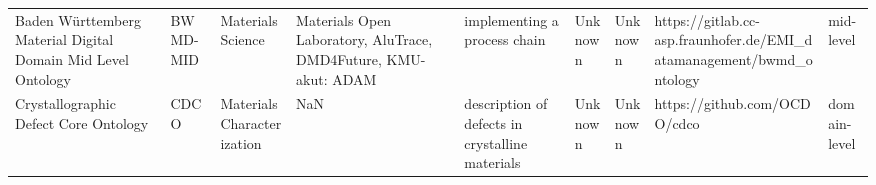 \begin{tabular}{m{5cm}m{2cm}m{5cm}m{2cm}m{2cm}m{2cm}m{2cm}m{2cm}m{2cm}}
                     Baden Württemberg Material Digital Domain Mid Level Ontology &                BWMD-MID &                           Materials Science &                                                                                                                                                                                                                                                                                                      Materials Open Laboratory, AluTrace, DMD4Future, KMU-akut: ADAM &                                                                                                                                                                                                                                                                                                                                                                           implementing a process chain &                                                                                                            Unknown &                                      Unknown &                               https://gitlab.cc-asp.fraunhofer.de/EMI_datamanagement/bwmd_ontology &         mid-level \\
                                            Crystallographic Defect Core Ontology &                    CDCO &                  Materials Characterization &                                                                                                                                                                                                                                                                                                                                                                  NaN &                                                                                                                                                                                                                                                                                                                                                        description of defects in crystalline materials &                                                                                                            Unknown &                                      Unknown &                                                                       https://github.com/OCDO/cdco &      domain-level \\

\end{tabular}
